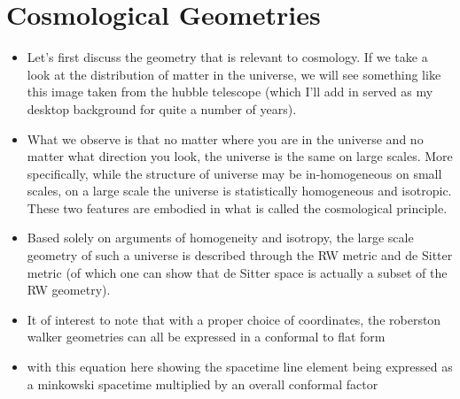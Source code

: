 \documentclass[10pt,letterpaper]{article}
\numberwithin{equation}{section}
\begin{document}
\section{Cosmological Geometries}
\begin{itemize}
	\item Let's first discuss the geometry that is relevant to cosmology. If we take a look at the distribution of matter in the universe, we will see something like this image taken from the hubble telescope (which I'll add in served as my desktop background for quite a number of years). 
	\item What we observe is that no matter where you are in the universe and no matter what direction you look, the universe is the same on large scales. More specifically, while the structure of universe may be in-homogeneous on small scales, on a large scale the universe is statistically homogeneous and isotropic. These two features are embodied in what is called the cosmological principle. 
	\item Based solely on arguments of homogeneity and isotropy, the large scale geometry of such a universe is described through the RW metric and de Sitter metric (of which one can show that de Sitter space is actually a subset of the RW geometry).
	\item It of interest to note that with a proper choice of coordinates, the roberston walker geometries can all be expressed in a conformal to flat form
	\item with this equation here showing the spacetime line element being expressed as a minkowski spacetime multiplied by an overall conformal factor
\end{itemize}

\end{document}
